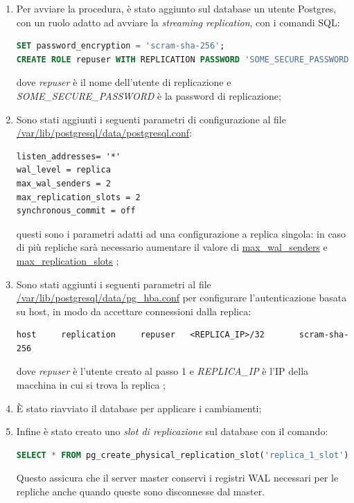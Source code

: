 \begin{enumerate}
  \item Per avviare la procedura, è stato aggiunto sul database un utente Postgres, con un ruolo adatto ad avviare la \textit{streaming replication}, con i comandi SQL:
  \vspace{1mm}
   \begin{lstlisting}[language=sql]
SET password_encryption = 'scram-sha-256'; 
CREATE ROLE repuser WITH REPLICATION PASSWORD 'SOME_SECURE_PASSWORD' LOGIN;\end{lstlisting}
dove \textit{repuser} è il nome dell'utente di replicazione e\\ \textit{SOME\_SECURE\_PASSWORD} è la password di replicazione;
  \item Sono stati aggiunti i seguenti parametri di configurazione al file \url{/var/lib/postgresql/data/postgresql.conf}:
  \vspace{1mm}
  \begin{lstlisting}[]
listen_addresses= '*'
wal_level = replica
max_wal_senders = 2
max_replication_slots = 2
synchronous_commit = off
\end{lstlisting}
questi sono i parametri adatti ad una configurazione a replica singola: in caso di più repliche sarà necessario aumentare il valore di \url{max_wal_senders} e \url{max_replication_slots} \cite{stre_re};

  \item Sono stati aggiunti i seguenti parametri al file \url{/var/lib/postgresql/data/pg_hba.conf} per configurare l'autenticazione basata su host, in modo da accettare connessioni dalla replica:
  \vspace{1mm}
\begin{lstlisting}[]
host     replication     repuser   <REPLICA_IP>/32       scram-sha-256
\end{lstlisting}
dove \textit{repuser} è l'utente creato al passo 1 e \textit{REPLICA\_IP} è l'IP della macchina in cui si trova la replica \cite{stre_re};
  \item È stato riavviato il database per applicare i cambiamenti;
  \item Infine è stato creato uno \textit{slot di replicazione} sul database con il comando:
  \vspace{1mm}
  \begin{lstlisting}[language=sql]
SELECT * FROM pg_create_physical_replication_slot('replica_1_slot');
\end{lstlisting}
Questo assicura che il server master conservi i registri WAL necessari per le repliche anche quando queste sono disconnesse dal master.
\end{enumerate}

